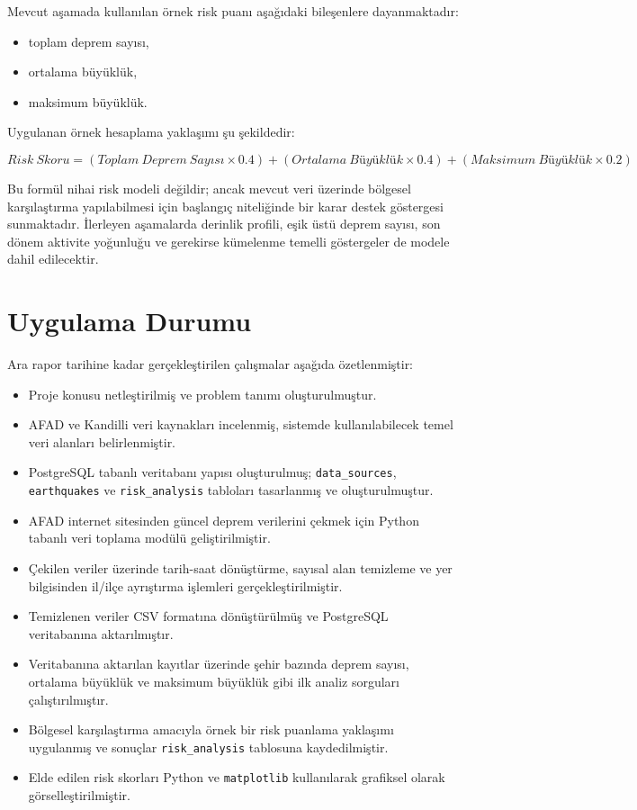 \documentclass[12pt,a4paper]{report}
\begin{document}
Mevcut aşamada kullanılan örnek risk puanı aşağıdaki bileşenlere dayanmaktadır:

\begin{itemize}
    \item toplam deprem sayısı,
    \item ortalama büyüklük,
    \item maksimum büyüklük.
\end{itemize}

Uygulanan örnek hesaplama yaklaşımı şu şekildedir:

\[
Risk\ Skoru = (Toplam\ Deprem\ Sayısı \times 0.4) + (Ortalama\ Büyüklük \times 0.4) + (Maksimum\ Büyüklük \times 0.2)
\]

Bu formül nihai risk modeli değildir; ancak mevcut veri üzerinde bölgesel karşılaştırma
yapılabilmesi için başlangıç niteliğinde bir karar destek göstergesi sunmaktadır.
İlerleyen aşamalarda derinlik profili, eşik üstü deprem sayısı, son dönem aktivite
yoğunluğu ve gerekirse kümelenme temelli göstergeler de modele dahil edilecektir.

\chapter{Uygulama Durumu}

Ara rapor tarihine kadar gerçekleştirilen çalışmalar aşağıda özetlenmiştir:

\begin{itemize}
    \item Proje konusu netleştirilmiş ve problem tanımı oluşturulmuştur.
    \item AFAD ve Kandilli veri kaynakları incelenmiş, sistemde kullanılabilecek temel veri alanları belirlenmiştir.
    \item PostgreSQL tabanlı veritabanı yapısı oluşturulmuş; \texttt{data\_sources}, \texttt{earthquakes} ve \texttt{risk\_analysis} tabloları tasarlanmış ve oluşturulmuştur.
    \item AFAD internet sitesinden güncel deprem verilerini çekmek için Python tabanlı veri toplama modülü geliştirilmiştir.
    \item Çekilen veriler üzerinde tarih-saat dönüştürme, sayısal alan temizleme ve yer bilgisinden il/ilçe ayrıştırma işlemleri gerçekleştirilmiştir.
    \item Temizlenen veriler CSV formatına dönüştürülmüş ve PostgreSQL veritabanına aktarılmıştır.
    \item Veritabanına aktarılan kayıtlar üzerinde şehir bazında deprem sayısı, ortalama büyüklük ve maksimum büyüklük gibi ilk analiz sorguları çalıştırılmıştır.
    \item Bölgesel karşılaştırma amacıyla örnek bir risk puanlama yaklaşımı uygulanmış ve sonuçlar \texttt{risk\_analysis} tablosuna kaydedilmiştir.
    \item Elde edilen risk skorları Python ve \texttt{matplotlib} kullanılarak grafiksel olarak görselleştirilmiştir.
\end{itemize}
\end{document}
